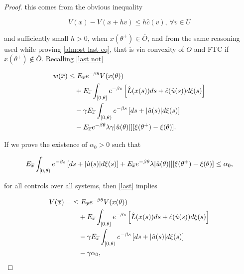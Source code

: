 \begin{theorem}
\begin{proof}
        this comes from the obvious inequality

        \[V(x) - V(x+hv)\leq h\hat{c}(v),\,\forall v\in U\]

        and sufficiently small $h>0$, when $x(\theta^+)\in\overline{O}$, and from the same reasoning used while proving \eqref{almost last eq}, that is via convexity of $O$ and FTC if $x(\theta^+)\notin \overline{O}$. Recalling \eqref{last not}

        \begin{equation}\label{last}
            \begin{aligned}
                w(\overline{x}) & \leq E_{\overline{x}} e^{-\beta \theta}V(x(\theta)) \\
                & \quad + E_{\overline{x}} \int_{[0,\theta]} e^{-\beta s}\left[\hat{L}(x(s))ds + \hat{c}(\hat{u}(s))d\xi(s)\right] \\
                & \quad - \gamma E_{\overline{x}} \int_{[0,\theta)} e^{-\beta s} \left[ds + \abs{\hat{u}(s)}d\xi(s)\right] \\
                & \quad - E_{\overline{x}}e^{-\beta\theta}\lambda\gamma\abs{\hat{u}(\theta)}][\xi(\theta^+)-\xi(\theta)].
            \end{aligned}
        \end{equation}

        If we prove the existence of $\alpha_0>0$ such that

        \begin{equation}\label{lastlast}
            E_{\overline{x}} \int_{[0,\theta)} e^{-\beta s} \left[ds + \abs{\hat{u}(s)}d\xi(s)\right] + E_{\overline{x}}e^{-\beta\theta}\lambda\abs{\hat{u}(\theta)}][\xi(\theta^+)-\xi(\theta)] \leq \alpha_0,
        \end{equation}

        for all controls over all systems, then \eqref{last} implies

        \begin{equation*}
            \begin{aligned}
                V(\overline{x}) = & \leq E_{\overline{x}} e^{-\beta \theta}V(x(\theta)) \\
                    & \quad + E_{\overline{x}} \int_{[0,\theta]} e^{-\beta s}\left[\hat{L}(x(s))ds + \hat{c}(\hat{u}(s))d\xi(s)\right] \\
                    & \quad - \gamma E_{\overline{x}} \int_{[0,\theta)} e^{-\beta s} \left[ds + \abs{\hat{u}(s)}d\xi(s)\right] \\
                    & \quad - \gamma\alpha_0,
            \end{aligned}
        \end{equation*}


\end{proof}
\end{theorem}
